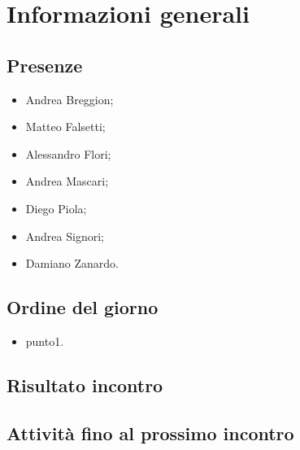 \section{Informazioni generali}
    \def\modifiche { 
        {Data, YYYY-MM-DD},
        {Ora inizio, hh:mm},
        {Ora fine, hh:mm},
        {Luogo, piattaforma},
    }
    

\subsection{Presenze}
\begin{itemize}
    \item Andrea Breggion;
    \item Matteo Falsetti;
    \item Alessandro Flori;
    \item Andrea Mascari;
    \item Diego Piola;
    \item Andrea Signori;
    \item Damiano Zanardo.
\end{itemize}
\subsection{Ordine del giorno}
\begin{itemize}
    \item punto1.
\end{itemize}

\subsection{Risultato incontro}
\subsection{Attività fino al prossimo incontro}

